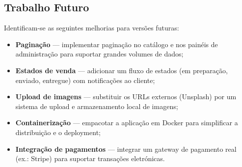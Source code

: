 \subsection{Trabalho Futuro}

Identificam-se as seguintes melhorias para versões futuras:

\begin{itemize}
    \item \textbf{Paginação} — implementar paginação no catálogo e nos painéis de administração para suportar grandes volumes de dados;
    \item \textbf{Estados de venda} — adicionar um fluxo de estados (em preparação, enviado, entregue) com notificações ao cliente;
    \item \textbf{Upload de imagens} — substituir os URLs externos (Unsplash) por um sistema de upload e armazenamento local de imagens;
    \item \textbf{Containerização} — empacotar a aplicação em Docker para simplificar a distribuição e o deployment;
    \item \textbf{Integração de pagamentos} — integrar um gateway de pagamento real (ex.: Stripe) para suportar transações eletrónicas.
\end{itemize}

